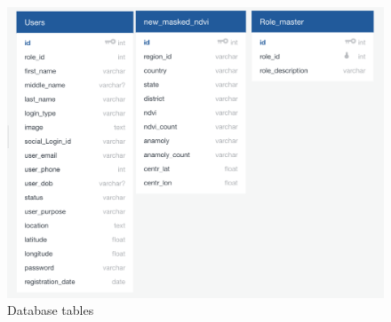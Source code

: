   \begin{figure}[H]
            \centering
            \includegraphics[width=1.0\linewidth]{figures/ch3/database_structure.png}
            \caption{\label{fig:database_structure} Database tables}
    \end{figure}
    
    




